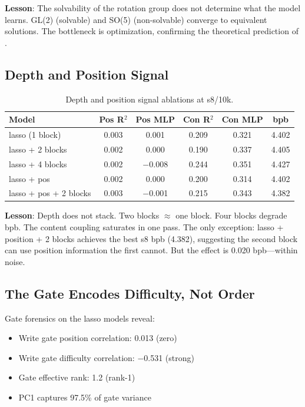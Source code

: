 \documentclass[11pt,a4paper]{article}
\begin{document}
\textbf{Lesson}: The solvability of the rotation group does not determine what the model learns. GL(2) (solvable) and SO(5) (non-solvable) converge to equivalent solutions. The bottleneck is optimization, confirming the theoretical prediction of \cite{diagonal_ssm_limits}.

\subsection{Depth and Position Signal}

\begin{table}[h]
\centering
\caption{Depth and position signal ablations at s8/10k.}
\begin{tabular}{lccccc}
\toprule
Model & Pos R$^2$ & Pos MLP & Con R$^2$ & Con MLP & bpb \\
\midrule
lasso (1 block) & 0.003 & 0.001 & 0.209 & 0.321 & 4.402 \\
lasso + 2 blocks & 0.002 & 0.000 & 0.190 & 0.337 & 4.405 \\
lasso + 4 blocks & 0.002 & $-$0.008 & 0.244 & 0.351 & 4.427 \\
lasso + pos & 0.002 & 0.000 & 0.200 & 0.314 & 4.402 \\
lasso + pos + 2 blocks & 0.003 & $-$0.001 & 0.215 & 0.343 & 4.382 \\
\bottomrule
\end{tabular}
\label{tab:depth}
\end{table}

\textbf{Lesson}: Depth does not stack. Two blocks $\approx$ one block. Four blocks degrade bpb. The content coupling saturates in one pass. The only exception: lasso + position + 2 blocks achieves the best s8 bpb (4.382), suggesting the second block can use position information the first cannot. But the effect is 0.020 bpb---within noise.

\subsection{The Gate Encodes Difficulty, Not Order}

Gate forensics on the lasso models reveal:
\begin{itemize}
\item Write gate position correlation: 0.013 (zero)
\item Write gate difficulty correlation: $-$0.531 (strong)
\item Gate effective rank: 1.2 (rank-1)
\item PC1 captures 97.5\% of gate variance
\end{itemize}
\end{document}
